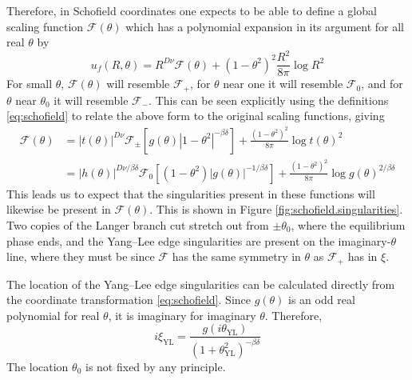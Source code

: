 \documentclass[
  aps,
  pre,
  preprint,
  longbibliography,
  floatfix
]{revtex4-2}
\begin{document}
Therefore, in Schofield coordinates one expects to be able to define a global
scaling function $\mathcal F(\theta)$ which has a polynomial expansion in its
argument for all real $\theta$ by
\begin{equation}
  u_f(R,\theta)=R^{D\nu}\mathcal F(\theta)+(1-\theta^2)^2\frac{R^2}{8\pi}\log R^2
\end{equation}
For small $\theta$, $\mathcal F(\theta)$ will
resemble $\mathcal F_+$, for $\theta$ near one it will resemble $\mathcal F_0$,
and for $\theta$ near $\theta_0$ it will resemble $\mathcal F_-$. This can be seen explicitly using the definitions \eqref{eq:schofield} to relate the above form to the original scaling functions, giving
\begin{equation} \label{eq:scaling.function.equivalences.2d}
  \begin{aligned}
    \mathcal F(\theta)
    &=|t(\theta)|^{D\nu}\mathcal F_\pm\left[g(\theta)|1-\theta^2|^{-\beta\delta}\right]
    +\frac{(1-\theta^2)^2}{8\pi}\log t(\theta)^2\\
    &=|h(\theta)|^{D\nu/\beta\delta}\mathcal F_0\left[(1-\theta^2)|g(\theta)|^{-1/\beta\delta}\right]
    +\frac{(1-\theta^2)^2}{8\pi}\log g(\theta)^{2/\beta\delta}
  \end{aligned}
\end{equation}
This leads us
to expect that the singularities present in these functions will likewise be
present in $\mathcal F(\theta)$. This is shown in Figure
\ref{fig:schofield.singularities}. Two copies of the Langer branch cut stretch
out from $\pm\theta_0$, where the equilibrium phase ends, and the Yang--Lee
edge singularities are present on the imaginary-$\theta$ line, where they must be since $\mathcal F$ has the same symmetry in $\theta$ as $\mathcal F_+$ has in $\xi$.

The location of the Yang--Lee edge singularities can be calculated directly
from the coordinate transformation \eqref{eq:schofield}. Since $g(\theta)$ is
an odd real polynomial for real $\theta$, it is imaginary for imaginary
$\theta$. Therefore,
\begin{equation}
  i\xi_{\mathrm{YL}}=\frac{g(i\theta_{\mathrm{YL}})}{(1+\theta_{\mathrm{YL}}^2)^{-\beta\delta}}
\end{equation}
The location $\theta_0$ is not fixed by any principle.
\end{document}
